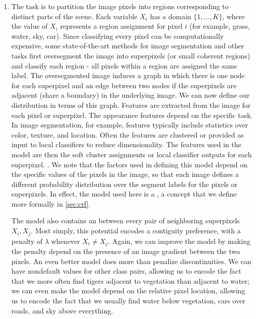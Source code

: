 \documentclass{article}
\begin{document}
\begin{exma}
\begin{enumerate}
\item {}
The task is to partition the image pixels into regions corresponding to distinct parts of the scene. Each variable $X_{i}$ has a domain $\{1, \ldots, K\}$, where the value of $X_{i}$ represents a region assignment for pixel $i$ (for example, grass, water, sky, car). Since classifying every pixel can be computationally expensive, some state-of-the-art methods for image segmentation and other tasks first oversegment the image into superpixels (or small coherent regions) and classify each region - all pixels within a region are assigned the same label. The oversegmented image induces a graph in which there is one node for each superpixel and an edge between two nodes if the superpixels are adjacent (share a boundary) in the underlying image. We can now define our distribution in terms of this graph.
Features are extracted from the image for each pixel or superpixel. The appearance features depend on the specific task. In image segmentation, for example, features typically include statistics over color, texture, and location. Often the features are clustered or provided as input to local classifiers to reduce dimensionality. The features used in the model are then the soft cluster assignments or local classifier outputs for each superpixel. . We note that the factors used in defining this model depend on the specific values of the pixels in the image, so that each image defines a different probability distribution over the segment labels for the pixels or superpixels. In effect, the model used here is a , a concept that we define more formally in \cref{sec:crf}.

The model also contains an  between every pair of neighboring superpixels $X_{i}, X_{j}$. Most simply, this potential encodes a contiguity preference, with a penalty of $\lambda$ whenever $X_{i} \neq X_{j}$. Again, we can improve the model by making the penalty depend on the presence of an image gradient between the two pixels. An even better model does more than penalize discontinuities. We can have nondefault values for other class pairs, allowing us to encode the fact that we more often find tigers adjacent to vegetation than adjacent to water; we can even make the model depend on the relative pixel location, allowing us to encode the fact that we usually find water below vegetation, cars over roads, and sky above everything.
\end{enumerate}
\end{exma}
\end{document}
